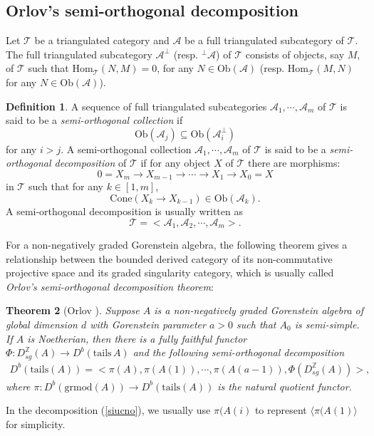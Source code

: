 \documentclass[11pt,reqno]{amsart}
\newtheorem{theorem}{Theorem}[section]
\theoremstyle{definition}
\newtheorem{definition}[theorem]{Definition}
\begin{document}
\subsection{Orlov's semi-orthogonal decomposition}\label{SG}

Let $\mathcal{T}$ be a triangulated category and $\mathcal{A}$ be 
a full triangulated subcategory of $\mathcal{T}$. 
The full triangulated subcategory $\mathcal{A}^{\perp}$
(resp. $^{\perp}\mathcal{A}$) of $\mathcal{T}$ 
consists of objects, say $M$, of $\mathcal T$ such that 
$
\mathrm{Hom}_{\mathcal{T}}(N, M) = 0
$,
for any $N \in \mathrm{Ob}(\mathcal{A})$
(resp. $\mathrm{Hom}_{\mathcal{T}}(M, N)$ for any $N \in \mathrm{Ob}(\mathcal{A})$). 

\begin{definition}
A sequence of 
full triangulated subcategories $\mathcal{A}_{1}, \cdots, \mathcal{A}_m$ of 
$\mathcal{T}$ is said to be a
{\it semi-orthogonal collection} if  
$$
\mathrm{Ob}(\mathcal{A}_j) \subseteq \mathrm{Ob}(\mathcal{A}^{\perp}_i)
$$
for any $i > j$. 
A semi-orthogonal collection $\mathcal{A}_{1}, \cdots, \mathcal{A}_m$ 
of $\mathcal{T}$ is said to be a 
{\it semi-orthogonal decomposition} of $\mathcal{T}$ 
if for any object $X$ of $\mathcal{T}$ there are morphisms:
$$
0 = X_m \rightarrow X_{m-1} \rightarrow \cdots\rightarrow X_{1} \rightarrow X_0 = X
$$
in $\mathcal{T}$ such that for any $k \in [1, m]$,
$$
\mathrm{Cone}(X_k \rightarrow X_{k-1}) \in \mathrm{Ob}(\mathcal{A}_k).
$$	
A semi-orthogonal decomposition is usually 
written as
$$
\mathcal{T} = \big<\mathcal{A}_{1}, \mathcal{A}_{2}, \cdots, \mathcal{A}_m \big>.
$$
\end{definition}

For a non-negatively graded Gorenstein algebra,
the following theorem gives a relationship between
the bounded derived category of its
non-commutative projective space and its graded singularity category,
which is usually called {\it Orlov's semi-orthogonal decomposition theorem}:

\begin{theorem}[{Orlov \cite[Theorem 16]{DR2}}]\label{orlov}
Suppose $A$ is a non-negatively graded Gorenstein algebra of global dimension 
$d$ with Gorenstein parameter $a > 0$ 
such that $A_0$ is semi-simple. 
If $A$ is Noetherian, 
then there is a fully faithful functor 
$\Phi: D^{\mathbb{Z}}_{sg}(A) \rightarrow D^{b}(\mathrm{tails}\, A)$
and the following semi-orthogonal decomposition
\begin{align}\label{siucno}
D^{b}(\mathrm{tails}(A)) = \big< \pi(A), \pi (A(1)), \cdots, 
\pi (A(a-1)), \Phi (D^{\mathbb{Z}}_{sg}(A)) \big>,
\end{align}
where $\pi: D^b(\mathrm{grmod}(A))
\to D^b(\mathrm{tails}(A))$
is the natural quotient functor.
\end{theorem}
In the decomposition (\ref{siucno}), we usually use 
$\pi (A(i)$ to represent $\langle\pi (A(1)\rangle$ 
for simplicity.
\end{document}
